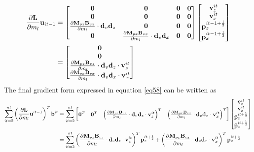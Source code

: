 \documentclass[revised,endfloat]{geophysics}
\begin{document}
\begin{equation}
\begin{split}
\frac{\partial {\bf L}}{\partial m_l} {\bf u}_{it-1} &=  
\begin{bmatrix}
\bf{0}   & \bf{0}   & \bf{0} & \bf{0}   \\
\bf{0}   & \bf{0}   & \bf{0} & \bf{0}   \\
\frac{{\partial \bf M}_{pz}{\bf B}_{vz}}{\partial m_l} \cdot {\bf d}_v{\bf d}_z & \bf{0} & {\bf 0} & \bf{0}   \\ 
\bf{0} & \frac{{\partial \bf M}_{px}{\bf B}_{vx}}{\partial m_l} \cdot {\bf d}_v{\bf d}_x & \bf{0} & {\bf 0} \\ 
\end{bmatrix}
\begin{bmatrix}
{\bf v}_z^{it} \\
{\bf v}_x^{it} \\
{\bf p}_z^{it-1+\frac{1}{2}} \\
{\bf p}_x^{it-1+\frac{1}{2}} \\
\end{bmatrix} \\
&=
\begin{bmatrix}
{\bf 0} \\
{\bf 0} \\
\frac{{\partial \bf M}_{pz}{\bf B}_{vz}}{\partial m_l} \cdot {\bf d}_v{\bf d}_z \cdot {\bf v}_z^{it} \\
\frac{{\partial \bf M}_{px}{\bf B}_{vx}}{\partial m_l} \cdot {\bf d}_v{\bf d}_x \cdot {\bf v}_x^{it} \\
\end{bmatrix} 
\end{split}
\label{eq70}  
\end{equation}
The final gradient form expressed in equation \ref{eq58} can be written as
\begin{equation}
\begin{split}
 \sum_{it=2}^{nt} \left( {\frac{\partial {\bf L}}{\partial m_l} {\bf u}^{it-1}} \right)^T {\bf b}^{it}  &=
\sum_{it=2}^{nt} \begin{bmatrix} 
 {\bf 0}^T & {\bf 0}^T & \left( \frac{{\partial \bf M}_{pz}{\bf B}_{vz}}{\partial m_l} \cdot {\bf d}_v{\bf d}_z \cdot {\bf v}_z^{it} \right)^T & \left( \frac{{\partial \bf M}_{px}{\bf B}_{vx}}{\partial m_l} \cdot {\bf d}_v{\bf d}_x \cdot {\bf v}_x^{it} \right)^T
\end{bmatrix} 
\begin{bmatrix}
\tilde{{\bf v}}_z^{it} \\
\tilde{{\bf v}}_x^{it} \\
\tilde{{\bf p}}_z^{it+\frac{1}{2}} \\
\tilde{{\bf p}}_x^{it+\frac{1}{2}} \\
\end{bmatrix} \\
&=  \sum_{it=2}^{nt} \left( \frac{{\partial \bf M}_{pz}{\bf B}_{vz}}{\partial m_l} \cdot {\bf d}_v{\bf d}_z \cdot {\bf v}_z^{it} \right)^T \tilde{{\bf p}}_z^{it+\frac{1}{2}} +  \left( \frac{{\partial \bf M}_{px}{\bf B}_{vx}}{\partial m_l} \cdot {\bf d}_v{\bf d}_x \cdot {\bf v}_x^{it} \right)^T \tilde{{\bf p}}_x^{it+\frac{1}{2}} 
\end{split}
\label{eq71}
 \end{equation}
\end{document}
